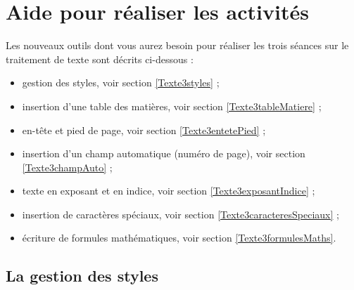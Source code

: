 \vfill



\newpage



\section{Aide pour réaliser les activités}\label{aide_seancesWord3}


Les nouveaux outils dont vous aurez besoin pour réaliser les trois séances sur le traitement de texte sont décrits ci-dessous :


\begin{itemize}   
\item gestion des styles, voir section \vref{Texte3styles} ;
\item insertion d'une table des matières, voir section \vref{Texte3tableMatiere} ;
\item en-tête et pied de page, voir section \vref{Texte3entetePied} ;
\item insertion d'un champ automatique (numéro de page), voir section \vref{Texte3champAuto} ;
\item texte en exposant et en indice, voir section \vref{Texte3exposantIndice} ;
\item insertion de caractères spéciaux, voir section \vref{Texte3caracteresSpeciaux} ; 
\item écriture de formules mathématiques, voir section \vref{Texte3formulesMaths}. 
\end{itemize}  




\subsection{La gestion des styles}\label{Texte3styles}

